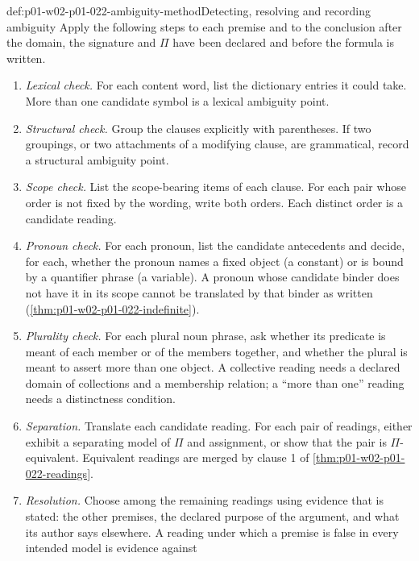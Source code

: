 \begin{hbmethod}{def:p01-w02-p01-022-ambiguity-method}{Detecting, resolving and recording ambiguity}
Apply the following steps to each premise and to the conclusion after the
domain, the signature and \(\Pi\) have been declared and before the formula
is written.
\begin{enumerate}
  \item \emph{Lexical check.} For each content word, list the dictionary
        entries it could take. More than one candidate symbol is a lexical
        ambiguity point.
  \item \emph{Structural check.} Group the clauses explicitly with
        parentheses. If two groupings, or two attachments of a modifying
        clause, are grammatical, record a structural ambiguity point.
  \item \emph{Scope check.} List the scope-bearing items of each clause.
        For each pair whose order is not fixed by the wording, write both
        orders. Each distinct order is a candidate reading.
  \item \emph{Pronoun check.} For each pronoun, list the candidate
        antecedents and decide, for each, whether the pronoun names a fixed
        object (a constant) or is bound by a quantifier phrase (a variable).
        A pronoun whose candidate binder does not have it in its scope cannot
        be translated by that binder as written
        (\cref{thm:p01-w02-p01-022-indefinite}).
  \item \emph{Plurality check.} For each plural noun phrase, ask whether its
        predicate is meant of each member or of the members together, and
        whether the plural is meant to assert more than one object. A
        collective reading needs a declared domain of collections and a
        membership relation; a ``more than one'' reading needs a
        distinctness condition.
  \item \emph{Separation.} Translate each candidate reading. For each pair
        of readings, either exhibit a separating model of \(\Pi\) and
        assignment, or show that the pair is \(\Pi\)-equivalent. Equivalent
        readings are merged by clause 1 of \cref{thm:p01-w02-p01-022-readings}.
  \item \emph{Resolution.} Choose among the remaining readings using
        evidence that is stated: the other premises, the declared purpose of
        the argument, and what its author says elsewhere. A reading under
        which a premise is false in every intended model is evidence against

\end{enumerate}
\end{hbmethod}
